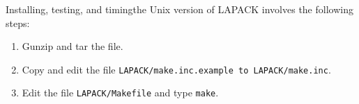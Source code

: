\documentclass[11pt]{report}
\begin{document}
Installing, testing, and timing\footnotemark[\value{footnote}] the Unix version of LAPACK
involves the following steps: 
\begin{enumerate}
\item Gunzip and tar the file.

\item Copy and edit the file \texttt{LAPACK/make.inc.example to LAPACK/make.inc}.
 
\item Edit the file \texttt{LAPACK/Makefile} and type \texttt{make}.

%
%
%
%
%

\end{enumerate}
\end{document}
